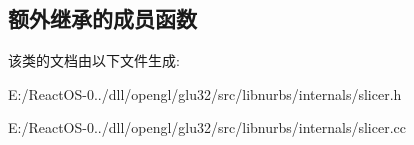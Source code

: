\subsection*{额外继承的成员函数}


该类的文档由以下文件生成\+:\begin{DoxyCompactItemize}
\item 
E\+:/\+React\+O\+S-\/0../dll/opengl/glu32/src/libnurbs/internals/slicer.\+h\item 
E\+:/\+React\+O\+S-\/0../dll/opengl/glu32/src/libnurbs/internals/slicer.\+cc\end{DoxyCompactItemize}

